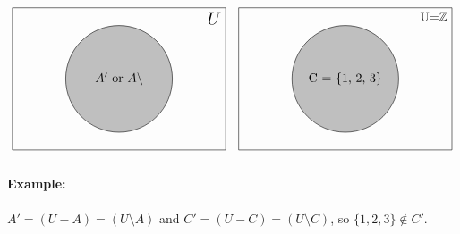 \documentclass[12pt]{article}
\newcommand*{\largeMath}[1]{\mbox{\Large$#1$}}
\begin{document}
  \begin{align}
  \begin{tikzpicture}
    \draw (-3,-2) rectangle (3,2) node[below left]{\largeMath{U}};
    \fill[lightgray] (0,0) circle (1.5cm) node {$A'$ or $A\setminus$};
    \draw (0,0) circle (1.5cm) node {$A'$ or $A\setminus$};
  \end{tikzpicture} && %
  \begin{tikzpicture}
    \draw (-3,-2) rectangle (3,2) node[below left]{U=$\mathbb{Z}$};
    \fill[lightgray] (0,0) circle (1.5cm) node {C = {1, 2, 3}};
    \draw (0,0) circle (1.5cm)  node {C = \{1, 2, 3\}};
  \end{tikzpicture}
  \end{align}

  \paragraph{Example:}  $A' = (U - A) = (U\setminus A)$ and $C' = (U - C) = (U\setminus C)$, so $\{1, 2, 3\} \notin C'$.


\end{document}
